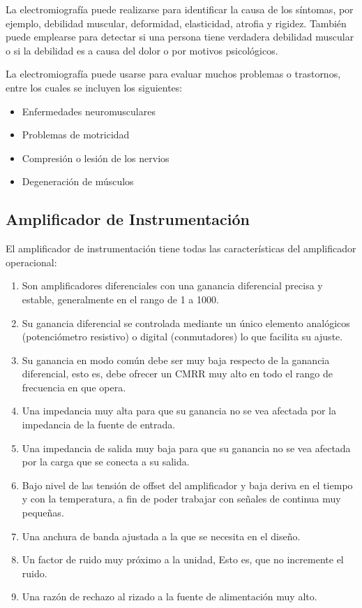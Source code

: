 \documentclass[12pt]{article}
\begin{document}
    La electromiografía puede realizarse para identificar la causa de los síntomas, por ejemplo, debilidad muscular, deformidad, elasticidad, atrofia y rigidez. También puede emplearse para detectar si una persona tiene verdadera debilidad muscular o si la debilidad es a causa del dolor o por motivos psicológicos.
    
    La electromiografía puede usarse para evaluar muchos problemas o trastornos, entre los cuales se incluyen los siguientes:
    \begin{itemize}
        \item Enfermedades neuromusculares
        \item Problemas de motricidad
        \item Compresión o lesión de los nervios
        \item Degeneración de músculos
    \end{itemize}
    
    \subsection{Amplificador de Instrumentación}
    El amplificador de instrumentación tiene todas las características del amplificador operacional:
    \begin{enumerate}
        \item Son amplificadores diferenciales con una ganancia diferencial precisa y estable, generalmente en el rango de 1 a 1000.
        \item Su ganancia diferencial se controlada mediante un único elemento analógicos (potenciómetro resistivo) o digital (conmutadores) lo que facilita su ajuste.
        \item Su ganancia en modo común debe ser muy baja respecto de la ganancia diferencial, esto es, debe ofrecer un CMRR muy alto en todo el rango de frecuencia en que opera.
        \item Una impedancia muy alta para que su ganancia no se vea afectada por la impedancia de la fuente de entrada.
        \item Una impedancia de salida muy baja para que su ganancia no se vea afectada por la carga que se conecta a su salida.
        \item Bajo nivel de las tensión de offset del amplificador y baja deriva en el tiempo y con la temperatura, a fin de poder trabajar con señales de continua muy pequeñas.
        \item Una anchura de banda ajustada a la que se necesita en el diseño.
        \item Un factor de ruido muy próximo a la unidad, Esto es, que no incremente el ruido.
        \item Una razón de rechazo al rizado a la fuente de alimentación muy alto.
    \end{enumerate}
\end{document}
